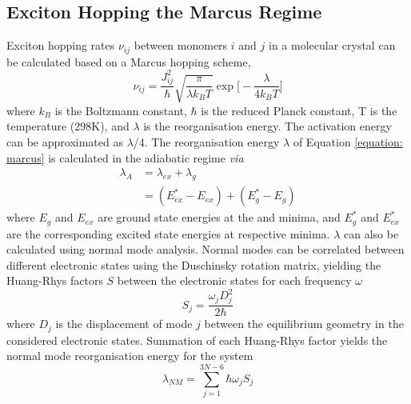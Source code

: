 \subsection{Exciton Hopping the Marcus Regime}\label{section: Connecting_Marcus}
Exciton hopping rates $\nu_{ij}$ between monomers $i$ and $j$ in a molecular crystal can be calculated based on a Marcus hopping scheme,
\begin{equation}
\nu_{ij}=\frac{J_{ij}^2}{\hbar}\sqrt{\frac{\pi}{\lambda k_{B}T}}\exp\bigg[-\frac{\lambda}{4k_{B}T}\bigg]
\label{equation: marcus}
\end{equation}
where $k_{B}$ is the Boltzmann constant, $\hbar$ is the reduced Planck
constant, T is the temperature (298K), and $\lambda$ is the reorganisation energy. The activation energy can be approximated as  $\lambda$/4.\cite{Stehr2014,Kimura2000} The reorganisation energy $\lambda$ of Equation \ref{equation: marcus} is calculated in the adiabatic regime \textit{via}
\begin{equation}
\begin{split}
\lambda_{A}&=\lambda_{ex}+\lambda_{g}\\
&=(E_{ex}^*-E_{ex})+(E_{g}^*-E_g)
\label{equation: lambda}
\end{split}
\end{equation}
where $E_g$ and $E_{ex}$ are ground state energies at the \szero{} and \sone{} minima, and $E_{g}^*$ and $E_{ex}^*$ are the corresponding excited state energies at respective minima. $\lambda$ can also be calculated using normal mode analysis. Normal modes can be correlated between different electronic states using the Duschinsky rotation matrix, yielding the Huang-Rhys factors $S$ between the electronic states for each frequency $\omega$
\begin{equation}
S_{j}=\frac{\omega_{j}D_{j}^2}{2\hbar{}}
\end{equation}
where $D_{j}$ is the displacement of mode $j$ between the equilibrium geometry in the considered electronic states. Summation of each Huang-Rhys factor yields the normal mode reorganisation energy for the system
\begin{equation}
\lambda_{NM}=\sum_{j=1}^{3N-6}\hbar{}\omega_{j}S_{j}
\end{equation}
